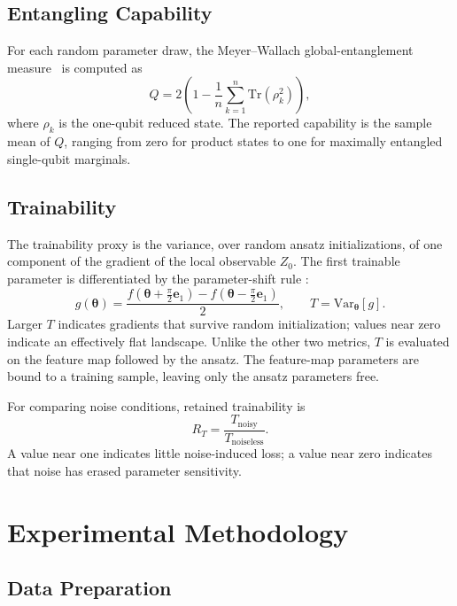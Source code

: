 \documentclass[conference]{IEEEtran}
\begin{document}
\subsection{Entangling Capability}

For each random parameter draw, the Meyer--Wallach global-entanglement
measure~\cite{meyer2002global} is computed as
\begin{equation}
  Q=2\left(1-\frac{1}{n}\sum_{k=1}^{n}\mathrm{Tr}(\rho_k^2)\right),
\end{equation}
where $\rho_k$ is the one-qubit reduced state.  The reported capability is
the sample mean of $Q$, ranging from zero for product states to one for
maximally entangled single-qubit marginals.

\subsection{Trainability}

The trainability proxy is the variance, over random ansatz initializations,
of one component of the gradient of the local observable $Z_0$.  The first
trainable parameter is differentiated by the parameter-shift rule
\cite{schuld2019evaluating}:
\begin{equation}
  g(\boldsymbol{\theta})=\frac{f(\boldsymbol{\theta}+\frac{\pi}{2}\mathbf{e}_1)
  -f(\boldsymbol{\theta}-\frac{\pi}{2}\mathbf{e}_1)}{2},
  \qquad T=\mathrm{Var}_{\boldsymbol{\theta}}[g].
\end{equation}
Larger $T$ indicates gradients that survive random initialization; values
near zero indicate an effectively flat landscape.  Unlike the other two
metrics, $T$ is evaluated on the feature map followed by the ansatz.  The
feature-map parameters are bound to a training sample, leaving only the
ansatz parameters free.

For comparing noise conditions, retained trainability is
\begin{equation}
  R_T=\frac{T_{\mathrm{noisy}}}{T_{\mathrm{noiseless}}}.
\end{equation}
A value near one indicates little noise-induced loss; a value near zero
indicates that noise has erased parameter sensitivity.

\section{Experimental Methodology}

\subsection{Data Preparation}
\end{document}
